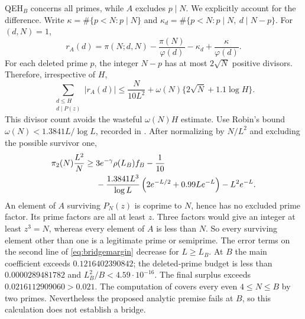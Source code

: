 \documentclass[11pt]{article}
\newcommand{\om}{\omega}
\begin{document}
QEH$_B$ concerns all primes, while $A$ excludes $p\mid N$.
We explicitly account for the difference. Write
$\kappa=\#\{p<N:p\mid N\}$ and
$\kappa_d=\#\{p<N:p\mid N,\ d\mid N-p\}$.
For $(d,N)=1$,
\[
r_A(d)=\pi(N;d,N)-\frac{\pi(N)}{\varphi(d)}
-\kappa_d+\frac{\kappa}{\varphi(d)}.
\]
For each deleted prime $p$, the integer $N-p$ has at most
$2\sqrt N$ positive divisors. Therefore, irrespective of $H$,
\begin{equation}\label{eq:del}
\sum_{\substack{d\le H\\d\mid P(z)}}|r_A(d)|
\le\frac{N}{10L^2}
+\om(N)\{2\sqrt N+1.1\log H\}.
\end{equation}
This divisor count avoids the wasteful $\om(N)H$ estimate.
Use Robin's bound $\om(N)<1.3841L/\log L$, recorded in \cite{BS}.
After normalizing by $N/L^2$ and excluding the possible survivor one,
\begin{align}\label{eq:bridgemargin}
\pi_2(N)\frac{L^2}{N}\ge{}&3e^{-\gamma}\rho(L_B)f_B-\frac1{10}
\\&-\frac{1.3841L^3}{\log L}
\left(2e^{-L/2}+0.99Le^{-L}\right)-L^2e^{-L}.\notag
\end{align}
An element of $A$ surviving $P_N(z)$ is coprime to $N$, hence has
no excluded prime factor. Its prime factors are all at least $z$.
Three factors would give an integer at least $z^3=N$, whereas every
element of $A$ is less than $N$. So every surviving element other
than one is a legitimate prime or semiprime.
The error terms on the second line of \eqref{eq:bridgemargin} decrease
for $L\ge L_B$. At $B$ the main coefficient exceeds
$0.1216402390842$; the deleted-prime budget is less than
$0.0000289481782$ and $L_B^2/B<4.59\cdot10^{-16}$.
The final surplus exceeds $0.0216112909060>0.021$.
The computation of \cite{OHP} covers every even $4\le N\le B$
by two primes. Nevertheless the proposed analytic premise fails
at $B$, so this calculation does not establish a bridge.
\end{document}
